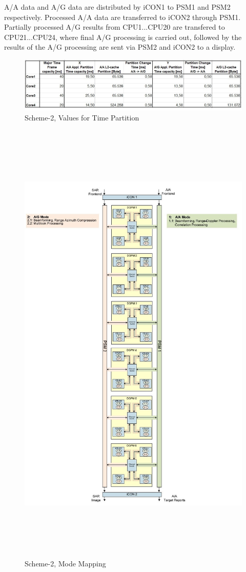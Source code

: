 A/A data and A/G data are distributed by iCON1 to PSM1 and PSM2 respectively. Processed A/A data are transferred to iCON2 through PSM1. Partially processed A/G results from CPU1...CPU20 are transfered to CPU21...CPU24, where final A/G processing is carried out, followed by the results of the A/G processing are sent via PSM2 and iCON2 to a display.

\begin{figure}[h!]
	\centering
	\includegraphics[width=150mm]{figures/scheme2_partition_values}
	\caption{Scheme-2, Values for Time Partition}
	\label{fig:existing_analysis:scheme2_partition_values}
\end{figure}

\begin{figure}[h!]
	\centering
	\includegraphics[width=160mm, height=220mm]{figures/scheme2_mode_mapping}
	\caption{Scheme-2, Mode Mapping}
	\label{fig:existing_analysis:scheme2_mode_mapping}
\end{figure}
\clearpage

